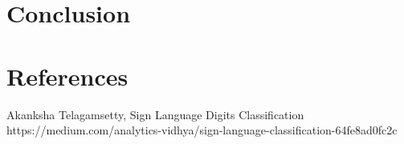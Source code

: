 \documentclass[conference]{IEEEtran}
\begin{document}
\section{Conclusion}

\section{References}

\begin{thebibliography}{00}
     Akanksha Telagamsetty, Sign Language Digits Classification https://medium.com/analytics-vidhya/sign-language-classification-64fe8ad0fc2c
\end{thebibliography}
\end{document}
